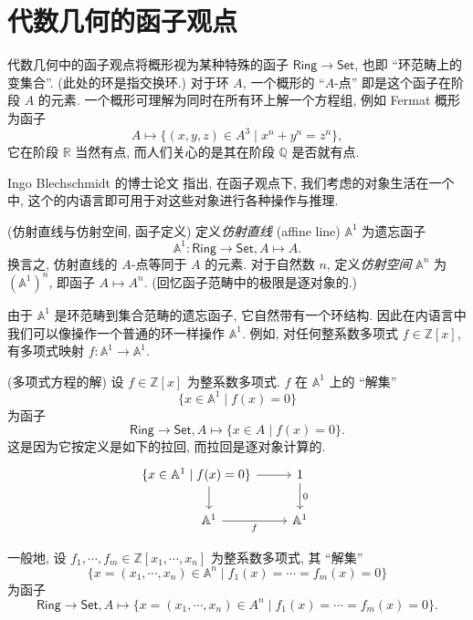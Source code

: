 
\section{代数几何的函子观点}

代数几何中的函子观点将概形视为某种特殊的函子 $\mathsf {Ring}\to\mathsf {Set}$, 也即 ``环范畴上的变集合''. (此处的环是指交换环.) 对于环 $A$, 一个概形的 ``$A$-点'' 即是这个函子在阶段 $A$ 的元素. 一个概形可理解为同时在所有环上解一个方程组, 例如 Fermat 概形为函子 $$A\mapsto \{(x,y,z)\in A^3\mid x^n+y^n=z^n\},$$ 它在阶段 $\mathbb{R}$ 当然有点, 而人们关心的是其在阶段 $\mathbb{Q}$ 是否就有点.

Ingo Blechschmidt 的博士论文 \cite{ILAG} 指出, 在函子观点下, 我们考虑的对象生活在一个\topos{}中, 这个\topos{}的内语言即可用于对这些对象进行各种操作与推理.

\begin{definition}
	[label={affine-line}]
	{(仿射直线与仿射空间, 函子定义)}
	定义\emph{仿射直线} (affine line) $\mathbb A^1$ 为遗忘函子
	$$
	\mathbb A^1\colon \mathsf {Ring}\to\mathsf {Set},A\mapsto A.
	$$
	换言之, 仿射直线的 $A$-点等同于 $A$ 的元素.
	对于自然数 $n$, 定义\emph{仿射空间} $\mathbb A^n$ 为 $(\mathbb A^1)^n$, 即函子 $A\mapsto A^n$. (回忆函子范畴中的极限是逐对象的.)
\end{definition}



由于 $\mathbb A^1$ 是环范畴到集合范畴的遗忘函子, 它自然带有一个环结构. 因此在内语言中我们可以像操作一个普通的环一样操作 $\mathbb A^1$.
例如, 对任何整系数多项式 $f\in\mathbb{Z}[x]$, 有多项式映射 $f\colon \mathbb A^1\to\mathbb A^1$.

\begin{example}
	{(多项式方程的解)}
	设 $f\in\mathbb{Z}[x]$ 为整系数多项式. $f$ 在 $\mathbb{A}^1$ 上的 ``解集''
	$$
	\{x\in\mathbb A^1\mid f(x)=0\}
	$$
	为函子
	$$
	\mathsf {Ring}\to\mathsf {Set}, A\mapsto\{x\in A\mid f(x)=0\}.
	$$
	这是因为它按定义是如下的拉回, 而拉回是逐对象计算的.
	\[\begin{tikzcd}[ampersand replacement=\&]
		{\hspace{-2em}\{x\in\mathbb A^1\mid f(x)=0\}} \& 1 \\
		{\mathbb A^1} \& {\mathbb A^1}
		\arrow[from=1-1, to=1-2]
		\arrow[from=1-1, to=2-1]
		\arrow["0", from=1-2, to=2-2]
		\arrow["f"', from=2-1, to=2-2]
	\end{tikzcd}\]
	
	一般地, 设 $f_1,\cdots,f_m\in\mathbb{Z}[x_1,\cdots,x_n]$ 为整系数多项式, 其 ``解集''
	$$
	\{x=(x_1,\cdots,x_n)\in\mathbb A^n\mid f_1(x)=\cdots=f_m(x)=0\}
	$$
	为函子
	$$
	\mathsf {Ring}\to\mathsf {Set}, A\mapsto\{x=(x_1,\cdots,x_n)\in A^n \mid f_1(x)=\cdots = f_m(x)=0\}.
	$$
\end{example}

